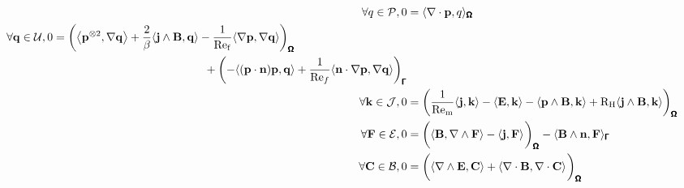     \begin{align}
        \forall q \in \calP,  0  &=  \langle\nabla\cdot\bfp, q\rangle_{\bfOmega}  \\
        \begin{split}
            \forall \bfq \in \calU,  0  &=  \left(\left\langle\bfp^{\otimes 2}, \nabla\bfq\right\rangle + \frac{2}{\beta}\langle\bfj\wedge\bfB, \bfq\rangle - \frac{1}{\rmRef}\langle\nabla\bfp, \nabla\bfq\rangle\right)_{\bfOmega}  \\
            &\;\;\;\;\;\;\;\;\;\;\;\;\;\;\;\;\;\;\;\;\;\;\;\;\;\;\;\;\;\;\;\;\;\;\;\;\;\;\;\;\;\;\;\;\;\;\;\;  + \left(- \langle(\bfp\cdot\bfn)\bfp, \bfq\rangle + \frac{1}{\rmRe_{f}}\langle\bfn\cdot\nabla\bfp, \nabla\bfq\rangle\right)_{\bfGamma}
        \end{split}  \\
        \forall \bfk \in \calJ,  0  &=  \left(\frac{1}{\rmRem}\langle\bfj, \bfk\rangle - \langle\bfE, \bfk\rangle - \langle\bfp\wedge\bfB, \bfk\rangle + \rmRH\langle\bfj\wedge\bfB, \bfk\rangle\right)_{\bfOmega}  \\
        \forall \bfF \in \calE,  0  &=  \left(\langle\bfB, \nabla\wedge\bfF\rangle - \langle\bfj, \bfF\rangle\tall\right)_{\bfOmega} - \langle\bfB\wedge\bfn, \bfF\rangle_{\bfGamma}  \\
        \forall \bfC \in \calB,  0  &=  \left(\langle\nabla\wedge\bfE, \bfC\rangle + \langle\nabla\cdot\bfB, \nabla\cdot\bfC\rangle\tall\right)_{\bfOmega}
    \end{align}
    